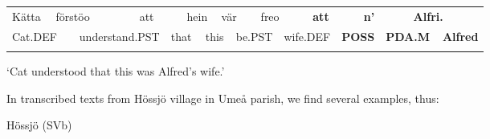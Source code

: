 \begin{tabular}{llllllllllllllllll}
\lsptoprule
Kätta & \multicolumn{2}{l}{förstöo

} & \multicolumn{2}{l}{att

} & \multicolumn{2}{l}{hein

} & \multicolumn{2}{l}{vär

} & \multicolumn{2}{l}{freo

} & \multicolumn{2}{l}{{\bfseries att}

} & \multicolumn{2}{l}{{\bfseries n’}

} & \multicolumn{2}{l}{{\bfseries Alfri.}

} & \\
\multicolumn{2}{l}{Cat.DEF

} & \multicolumn{2}{l}{understand.PST

} & \multicolumn{2}{l}{that

} & \multicolumn{2}{l}{this

} & \multicolumn{2}{l}{be.PST

} & \multicolumn{2}{l}{wife.DEF

} & \multicolumn{2}{l}{{\bfseries POSS}

} & \multicolumn{2}{l}{{\bfseries PDA.M}

} & \multicolumn{2}{l}{{\bfseries Alfred}

}\\
\lspbottomrule
\end{tabular}

\begin{styleTranslation}
‘Cat understood that this was Alfred’s wife.’

\end{styleTranslation}

\begin{styleBodyTextFirst}
In transcribed texts from Hössjö village in Umeå parish, we find several examples, thus:

\end{styleBodyTextFirst}

\begin{listWWNumileveli}
\item 

\begin{styleExample}
Hössjö (SVb)

\end{styleExample}

\end{listWWNumileveli}

